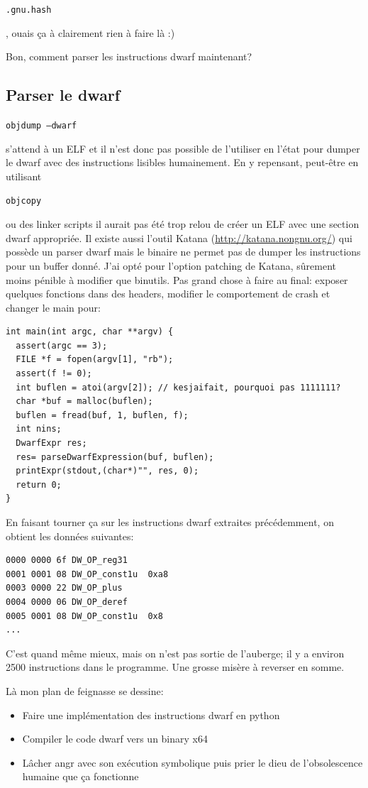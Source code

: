 \documentclass[14pt]{article}
\newcommand{\inlinebox}[2]{%
\colorbox{bg}{%
\parbox[b][0.6em]{\widthof{\texttt{#2}}}{\texttt{#2}}
}
}
\newcommand{\inlinebash}[1]{ \inlinebox{bash}{#1} }
\theoremstyle{definition}
\begin{document}
\inlinebash{.gnu.hash}, ouais ça à clairement rien à faire là :)

Bon, comment parser les instructions dwarf maintenant?

\subsection{Parser le dwarf}

\inlinebash{objdump --dwarf} s'attend à un ELF et il n'est donc pas possible de l'utiliser en l'état pour dumper le dwarf avec des instructions lisibles humainement. En y repensant, peut-être en utilisant \inlinebash{objcopy} ou des linker scripts il aurait pas été trop relou de créer un ELF avec une section dwarf appropriée.
Il existe aussi l'outil Katana (\url{http://katana.nongnu.org/}) qui possède un parser dwarf mais le binaire ne permet pas de dumper les instructions pour un buffer donné.
J'ai opté pour l'option patching de Katana, sûrement moins pénible à modifier que binutils. Pas grand chose à faire au final: exposer quelques fonctions dans des headers, modifier le comportement de crash et changer le main pour:

\begin{verbatim}
int main(int argc, char **argv) {
  assert(argc == 3);
  FILE *f = fopen(argv[1], "rb");
  assert(f != 0);
  int buflen = atoi(argv[2]); // kesjaifait, pourquoi pas 1111111?
  char *buf = malloc(buflen);
  buflen = fread(buf, 1, buflen, f);
  int nins;
  DwarfExpr res;
  res= parseDwarfExpression(buf, buflen);
  printExpr(stdout,(char*)"", res, 0);
  return 0;
}
\end{verbatim}

En faisant tourner ça sur les instructions dwarf extraites précédemment, on obtient les données suivantes:
\begin{verbatim}
0000 0000 6f DW_OP_reg31 
0001 0001 08 DW_OP_const1u  0xa8
0003 0000 22 DW_OP_plus 
0004 0000 06 DW_OP_deref 
0005 0001 08 DW_OP_const1u  0x8
...
\end{verbatim}

C'est quand même mieux, mais on n’est pas sortie de l'auberge; il y a environ 2500 instructions dans le programme. Une grosse misère à reverser en somme.


Là mon plan de feignasse se dessine:
\begin{itemize}
    \item Faire une implémentation des instructions dwarf en python
    \item Compiler le code dwarf vers un binary x64
    \item Lâcher angr avec son exécution symbolique puis prier le dieu de l'obsolescence humaine que ça fonctionne
\end{itemize}
\end{document}
